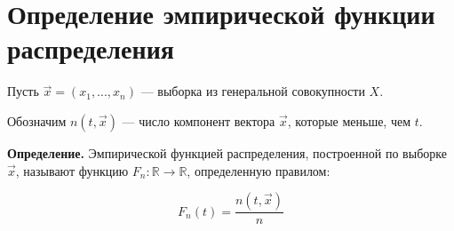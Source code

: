 \section{Определение эмпирической функции распределения}

Пусть $\vec{x} = (x_1, ..., x_n)$ --- выборка из генеральной совокупности $X$.

Обозначим $n(t, \vec{x})$ --- число компонент вектора $\vec{x}$,
которые меньше, чем $t$.

\textbf{Определение.} Эмпирической функцией распределения, построенной по
выборке $\vec{x}$, называют функцию $F_n: \mathbb{R} \to \mathbb{R}$,
определенную правилом: 

\begin{equation}
    F_n(t) = \frac{n(t, \vec x)}{n}
\end{equation}
